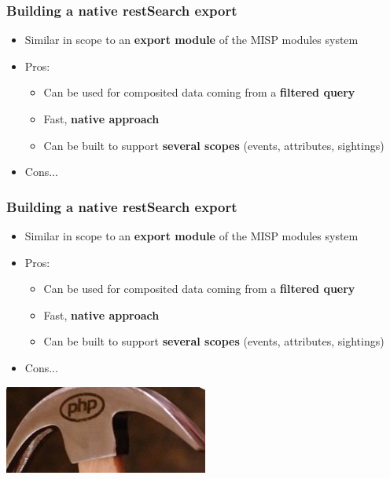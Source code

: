 
\begin{frame}
\titlepage
\end{frame}

\begin{frame}
  \frametitle{Building a native restSearch export}
  \begin{itemize}
    \item Similar in scope to an {\bf export module} of the MISP modules system
    \item Pros:
    \begin{itemize}
      \item Can be used for composited data coming from a {\bf filtered query}
      \item Fast, {\bf native approach}
      \item Can be built to support {\bf several scopes} (events, attributes, sightings)
    \end{itemize}
    \item Cons...
  \end{itemize}
\end{frame}

\begin{frame}
  \frametitle{Building a native restSearch export}
  \begin{itemize}
        \item Similar in scope to an {\bf export module} of the MISP modules system
    \item Pros:
    \begin{itemize}
      \item Can be used for composited data coming from a {\bf filtered query}
      \item Fast, {\bf native approach}
      \item Can be built to support {\bf several scopes} (events, attributes, sightings)
    \end{itemize}
    \item Cons...
  \end{itemize}
  \begin{center}
    \includegraphics[scale=0.5]{lolphp.jpg}
  \end{center}
\end{frame}

